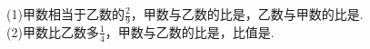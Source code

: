 (1)甲数相当于乙数的$\frac{2}{9}$，甲数与乙数的比是\key{\qquad}，乙数与甲数的比是\key{\qquad}. \\

\hspace*{4mm}(2)甲数比乙数多$\frac{1}{4}$，甲数与乙数的比是\key{\qquad}，比值是\key{\qquad}. \\





